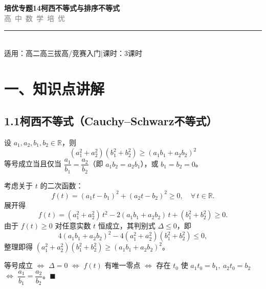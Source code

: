 \documentclass[12pt, a4paper]{ctexart}
\begin{document}
\begin{center}
{\Huge\bfseries\textcolor{mainblue}{培优专题14\quad 柯西不等式与排序不等式}}\\[12pt]
{\Large\textcolor{gray}{高\ 中\ 数\ 学\ 培\ 优}}\\[8pt]
\rule{0.6\textwidth}{1pt}\\[8pt]
{\normalsize 适用：高二高三拔高/竞赛入门\quad |\quad 课时：3课时}
\end{center}
\vspace{10pt}

\section*{\textcolor{mainblue}{一、知识点讲解}}

\subsection*{1.1\quad 柯西不等式（Cauchy--Schwarz不等式）}

\begin{knowledgebox}[二维形式]
设 $a_1, a_2, b_1, b_2 \in \mathbb{R}$，则
\[
  \boxed{(a_1^2 + a_2^2)(b_1^2 + b_2^2) \geqslant (a_1 b_1 + a_2 b_2)^2}
\]
等号成立当且仅当 $\dfrac{a_1}{b_1} = \dfrac{a_2}{b_2}$（即 $a_1 b_2 = a_2 b_1$），或 $b_1 = b_2 = 0$。
\end{knowledgebox}

\begin{knowledgebox}
考虑关于 $t$ 的二次函数：
\[
  f(t) = (a_1 t - b_1)^2 + (a_2 t - b_2)^2 \geqslant 0, \quad \forall\, t \in \mathbb{R}.
\]
展开得
\[
  f(t) = (a_1^2 + a_2^2)\,t^2 - 2(a_1 b_1 + a_2 b_2)\,t + (b_1^2 + b_2^2) \geqslant 0.
\]
由于 $f(t) \geqslant 0$ 对任意实数 $t$ 恒成立，其判别式 $\Delta \leqslant 0$，即
\[
  4(a_1 b_1 + a_2 b_2)^2 - 4(a_1^2 + a_2^2)(b_1^2 + b_2^2) \leqslant 0,
\]
整理即得 $(a_1^2 + a_2^2)(b_1^2 + b_2^2) \geqslant (a_1 b_1 + a_2 b_2)^2$。

等号成立 $\Leftrightarrow$ $\Delta = 0$ $\Leftrightarrow$ $f(t)$ 有唯一零点 $\Leftrightarrow$ 存在 $t_0$ 使 $a_1 t_0 = b_1,\ a_2 t_0 = b_2$ $\Leftrightarrow$ $\dfrac{a_1}{b_1} = \dfrac{a_2}{b_2}$。\hfill $\blacksquare$
\end{knowledgebox}
\end{document}
